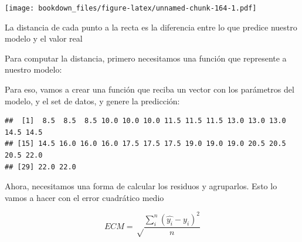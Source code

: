 \documentclass[]{book}
\newenvironment{Shaded}{\begin{snugshade}}{\end{snugshade}}
\newcommand{\ControlFlowTok}[1]{\textcolor[rgb]{0.13,0.29,0.53}{\textbf{#1}}}
\newcommand{\DecValTok}[1]{\textcolor[rgb]{0.00,0.00,0.81}{#1}}
\newcommand{\FloatTok}[1]{\textcolor[rgb]{0.00,0.00,0.81}{#1}}
\newcommand{\KeywordTok}[1]{\textcolor[rgb]{0.13,0.29,0.53}{\textbf{#1}}}
\newcommand{\NormalTok}[1]{#1}
\newcommand{\OperatorTok}[1]{\textcolor[rgb]{0.81,0.36,0.00}{\textbf{#1}}}
\newcommand{\StringTok}[1]{\textcolor[rgb]{0.31,0.60,0.02}{#1}}
\begin{document}
\texttt{[image: bookdown\_files/figure-latex/unnamed-chunk-164-1.pdf]}

La distancia de cada punto a la recta es la diferencia entre lo que predice nuestro modelo y el valor real

Para computar la distancia, primero necesitamos una función que represente a nuestro modelo:

Para eso, vamos a crear una función que reciba un vector con los parámetros del modelo, y el set de datos, y genere la predicción:

\begin{Shaded}
\end{Shaded}

\begin{verbatim}
##  [1]  8.5  8.5  8.5 10.0 10.0 10.0 11.5 11.5 11.5 13.0 13.0 13.0 14.5 14.5
## [15] 14.5 16.0 16.0 16.0 17.5 17.5 17.5 19.0 19.0 19.0 20.5 20.5 20.5 22.0
## [29] 22.0 22.0
\end{verbatim}

Ahora, necesitamos una forma de calcular los residuos y agruparlos. Esto lo vamos a hacer con el error cuadrático medio

\[ECM = \sqrt\frac{\sum_i^n{(\hat{y_i} - y_i)^2}}{n}\]

\begin{Shaded}
\end{Shaded}
\end{document}
